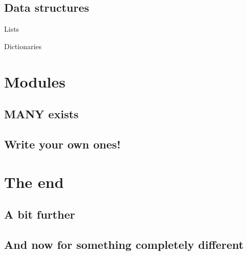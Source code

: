 \documentclass[ignorenonframetext,]{beamer}
\begin{document}
\subsection{Data structures}
\begin{frame}{Lists}
\end{frame}

\begin{frame}{Dictionaries}
\end{frame}

\section{Modules}
\subsection{MANY exists}
\subsection{Write your own ones!}

\section{The end}
\subsection{A bit further}
\subsection{And now for something completely different}
\end{document}
